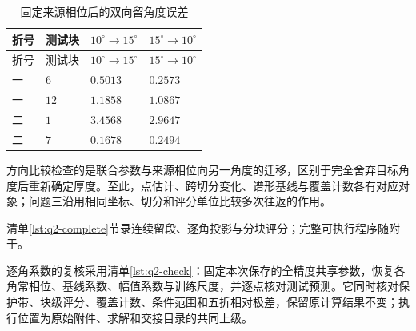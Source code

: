 \begingroup
\small
\renewcommand{\arraystretch}{1.15}
\begin{longtable}{>{\centering\arraybackslash}p{}>{\centering\arraybackslash}p{}>{\centering\arraybackslash}p{}>{\centering\arraybackslash}p{}}
\caption{固定来源相位后的双向留角度误差}\label{tab:q2-app-angle}\\
\toprule
折号 & 测试块 & $10^\circ\!\to15^\circ$ & $15^\circ\!\to10^\circ$ \\
\midrule
\endfirsthead
\toprule
折号 & 测试块 & $10^\circ\!\to15^\circ$ & $15^\circ\!\to10^\circ$ \\
\midrule
\endhead
\bottomrule
\endfoot
一 & $6$ & $0.5013$ & $0.2573$ \\
一 & $12$ & $1.1858$ & $1.0867$ \\
二 & $1$ & $3.4568$ & $2.9647$ \\
二 & $7$ & $0.1678$ & $0.2494$ \\
\end{longtable}
\endgroup

方向比较检查的是联合参数与来源相位向另一角度的迁移，区别于完全舍弃目标角度后重新确定厚度。至此，点估计、跨切分变化、谱形基线与覆盖计数各有对应对象；问题三沿用相同坐标、切分和评分单位比较多次往返的作用。

清单\ref{lst:q2-complete}节录连续留段、逐角投影与分块评分；完整可执行程序随附于。

\begingroup
\renewcommand{\lstlistingname}{清单}

\endgroup

逐角系数的复核采用清单\ref{lst:q2-check}：固定本次保存的全精度共享参数，恢复各角常相位、基线系数、幅值系数与训练尺度，并逐点核对测试预测。它同时核对保护带、块级评分、覆盖计数、条件范围和五折相对极差，保留原计算结果不变；执行位置为原始附件、求解和交接目录的共同上级。

